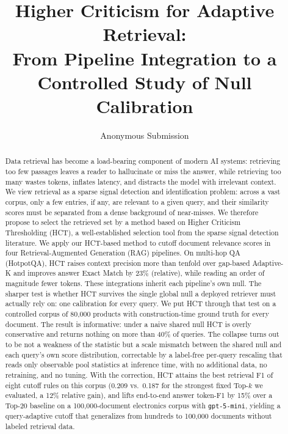 \documentclass[letterpaper]{article} %
\title{Higher Criticism for Adaptive Retrieval:\\From Pipeline Integration to a Controlled Study of Null Calibration}
\author{Anonymous Submission}
\begin{document}
\maketitle

\begin{abstract}
Data retrieval has become a load-bearing component of modern AI
systems: retrieving too few passages leaves a reader to hallucinate or
miss the answer, while retrieving too many wastes tokens, inflates
latency, and distracts the model with irrelevant context. We view
retrieval as a sparse signal detection and identification problem:
across a vast corpus, only a few entries, if any, are relevant to a
given query, and their similarity scores must be separated from a
dense background of near-misses. We therefore propose to select the
retrieved set by a method based on Higher Criticism Thresholding
(HCT), a well-established selection tool from the sparse signal
detection literature. We apply our HCT-based method to cutoff
document relevance scores in four Retrieval-Augmented Generation
(RAG) pipelines. On multi-hop QA (HotpotQA), HCT raises context precision more than
tenfold over gap-based Adaptive-K and improves answer Exact Match by
23\% (relative), while reading an order of magnitude fewer tokens.
These integrations inherit each pipeline's own null. The sharper
test is whether HCT survives the single global null a deployed
retriever must actually rely on: one calibration for every query.
We put HCT through that test on a controlled corpus of 80{,}000
products with construction-time ground truth for every document.
The result is informative: under a naive shared null HCT is overly
conservative and returns nothing on more than 40\% of queries. The
collapse turns out to be not a weakness of the statistic but a
scale mismatch between the shared null and each query's own score
distribution, correctable by a label-free per-query rescaling that
reads only observable pool statistics at inference time, with no
additional data, no retraining, and no tuning. With the correction,
HCT attains the best retrieval F1 of eight cutoff rules on this
corpus (0.209 vs.\ 0.187 for the strongest fixed Top-$k$ we
evaluated, a 12\% relative gain), and lifts end-to-end answer
token-F1 by 15\% over a Top-20 baseline on a 100{,}000-document
electronics corpus with \texttt{gpt-5-mini}, yielding a
query-adaptive cutoff that generalizes from hundreds to 100{,}000
documents without labeled retrieval data.
\end{abstract}
\end{document}
